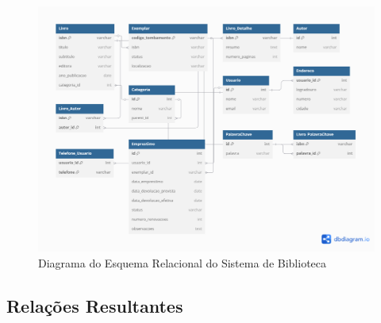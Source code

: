 \documentclass[12pt,a4paper]{article}
\begin{document}
\begin{figure}[H]
    \centering
    \includegraphics[width=\textwidth]{ModeloRelacional.png}
    \caption{Diagrama do Esquema Relacional do Sistema de Biblioteca}
    \label{fig:modelo-relacional}
\end{figure}

\subsection{Relações Resultantes}
\end{document}
